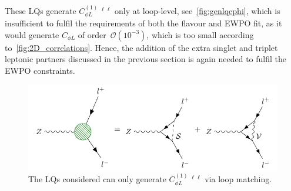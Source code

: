 These LQs generate $C_{\phi L}^{(1)}\ ^{\ell\ell}$ only at loop-level, see~\autoref{fig:genlqcphi}, which is insufficient to fulfil the requirements of both the flavour and EWPO fit, as it would generate $C_{\phi L}$ of order~$ \mathcal{O}(10^{-3})$, which is too small according to~\autoref{fig:2D_correlations}. Hence, the addition of the extra singlet and triplet leptonic partners discussed in the previous section is again needed to fulfil the EWPO constraints.
\begin{figure}[htpb!]
	\centering 
	\includegraphics[width=\linewidth]{figures/LQ_tri}
	\caption{The LQs considered can only generate  $C_{\phi L}^{(1)}\ ^{\ell\ell}$ via loop matching. }    
	\label{fig:genlqcphi}
\end{figure}
